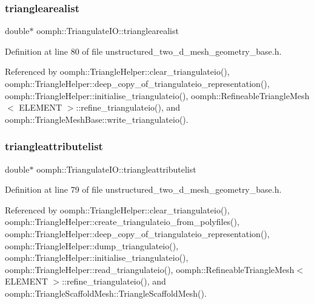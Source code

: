 \mbox{\label{structoomph_1_1TriangulateIO_a9a976d4e6a020e3be97fab821a96fd66}} 
\subsubsection{\texorpdfstring{trianglearealist}{trianglearealist}}
{\footnotesize\ttfamily double$\ast$ oomph\+::\+Triangulate\+I\+O\+::trianglearealist}



Definition at line 80 of file unstructured\+\_\+two\+\_\+d\+\_\+mesh\+\_\+geometry\+\_\+base.\+h.



Referenced by oomph\+::\+Triangle\+Helper\+::clear\+\_\+triangulateio(), oomph\+::\+Triangle\+Helper\+::deep\+\_\+copy\+\_\+of\+\_\+triangulateio\+\_\+representation(), oomph\+::\+Triangle\+Helper\+::initialise\+\_\+triangulateio(), oomph\+::\+Refineable\+Triangle\+Mesh$<$ E\+L\+E\+M\+E\+N\+T $>$\+::refine\+\_\+triangulateio(), and oomph\+::\+Triangle\+Mesh\+Base\+::write\+\_\+triangulateio().

\mbox{\label{structoomph_1_1TriangulateIO_aa8bbc97ce309d32e0695ac703a0817b7}} 
\subsubsection{\texorpdfstring{triangleattributelist}{triangleattributelist}}
{\footnotesize\ttfamily double$\ast$ oomph\+::\+Triangulate\+I\+O\+::triangleattributelist}



Definition at line 79 of file unstructured\+\_\+two\+\_\+d\+\_\+mesh\+\_\+geometry\+\_\+base.\+h.



Referenced by oomph\+::\+Triangle\+Helper\+::clear\+\_\+triangulateio(), oomph\+::\+Triangle\+Helper\+::create\+\_\+triangulateio\+\_\+from\+\_\+polyfiles(), oomph\+::\+Triangle\+Helper\+::deep\+\_\+copy\+\_\+of\+\_\+triangulateio\+\_\+representation(), oomph\+::\+Triangle\+Helper\+::dump\+\_\+triangulateio(), oomph\+::\+Triangle\+Helper\+::initialise\+\_\+triangulateio(), oomph\+::\+Triangle\+Helper\+::read\+\_\+triangulateio(), oomph\+::\+Refineable\+Triangle\+Mesh$<$ E\+L\+E\+M\+E\+N\+T $>$\+::refine\+\_\+triangulateio(), and oomph\+::\+Triangle\+Scaffold\+Mesh\+::\+Triangle\+Scaffold\+Mesh().

